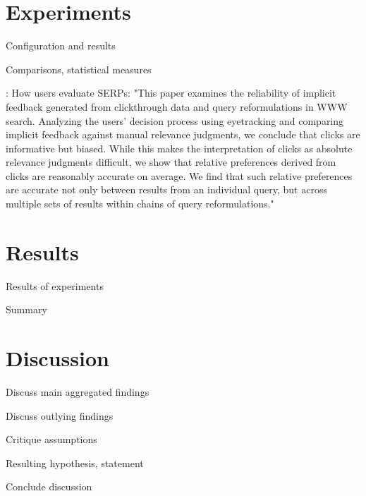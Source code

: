 \section{Experiments}

Configuration and results

Comparisons, statistical measures


\cite[p1]{Joachims2007}: How users evaluate SERPs:
"This paper examines the reliability of implicit feedback generated from clickthrough data and query reformulations in WWW search. Analyzing the users’ decision process using eyetracking and comparing implicit feedback against manual relevance judgments, we conclude that clicks are informative but biased. While this makes the interpretation of clicks as absolute relevance judgments difficult, we show that relative preferences derived from clicks are reasonably accurate on average. We find that such relative preferences are accurate not only between results from an individual query, but across multiple sets of results within chains of query reformulations."

\section{Results}

Results of experiments

Summary


\section{Discussion}


Discuss main aggregated findings

Discuss outlying findings

Critique assumptions

Resulting hypothesis, statement 

Conclude discussion
